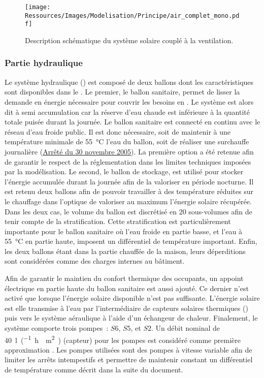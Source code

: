\begin{figure}
    \centering
    \texttt{[image: Ressources/Images/Modelisation/Principe/air\_complet\_mono.pdf]}
    \caption[escription schématique du système solaire couplé à la ventilation]
            {Description schématique du système solaire couplé à la ventilation.}
    \label{fig:air_complet_mono}
\end{figure}

\subsubsection{Partie hydraulique} %
\label{ssub:partie_hyraulique}
Le système hydraulique () est composé de deux ballons dont les
caractéristiques sont disponibles dans le . Le premier, le ballon
sanitaire, permet de lisser la demande en énergie nécessaire pour couvrir les besoins en
. Le système est alors dit à semi accumulation car la réserve d’eau chaude est inférieure
à la quantité totale puisée durant la journée. Le ballon sanitaire est connecté en
continu avec le réseau d’eau froide public. Il est donc nécessaire, soit de maintenir
à une température minimale de \SI{55}{\celsius} l’eau du ballon, soit de réaliser une surchauffe journalière
(\href{https://www.legifrance.gouv.fr/affichTexte.do?cidTexte=JORFTEXT000000423756}{Arrêté
du 30 novembre 2005}). La première option a été retenue afin de garantir le respect de la
réglementation dans les limites techniques imposées par la modélisation. Le second, le
ballon de stockage, est utilisé pour stocker l’énergie accumulée durant la journée afin de
la valoriser en période nocturne. Il est retenu deux ballons afin de pouvoir travailler
à des température réduites sur le chauffage dans l’optique de valoriser au maximum
l’énergie solaire récupérée.
Dans les deux cas, le volume du ballon est discrétisé en
\num{20} sous-volumes afin de tenir compte de la stratification. Cette stratification est
particulièrement importante pour le ballon sanitaire où l’eau froide en partie basse, et
l’eau à \SI{55}{\celsius} en partie haute, imposent un différentiel de température
important. Enfin, les deux ballons étant dans la partie chauffée de la maison, leurs
déperditions sont considérées comme des charges internes au bâtiment.

Afin de garantir le maintien du confort thermique des occupants, un appoint électrique en
partie haute du ballon sanitaire est aussi ajouté. Ce dernier n’est activé que lorsque
l’énergie solaire disponible n’est pas suffisante. L’énergie solaire est elle transmise à
l’eau par l’intermédiaire de capteurs solaires thermiques () puis vers le
système aéraulique à l’aide d’un échangeur de chaleur. Finalement, le système comporte trois
pompes~: $S6$, $S5$, et $S2$. Un débit nominal de \SI{40}{\litre\per(\hour\period\meter\squared)}
(capteur) pour les pompes est considéré comme première approximation
\parencite{Peuser2005}. Les pompes utilisées sont des pompes à vitesse variable afin de
limiter les arrêts intempestifs \parencite{Kicsiny20123489} et permettre de maintenir
constant un différentiel de température comme décrit dans la suite du document.


